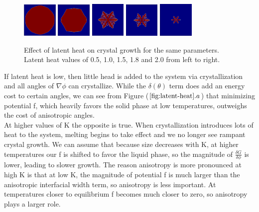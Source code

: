 \documentclass[10pt]{article} %
\begin{document}
\begin{figure}[h!]
  \centering
  \includegraphics[width=0.15\textwidth]{../F-0.5-10.png}
  \includegraphics[width=0.15\textwidth]{../F-1.0-10.png}
  \includegraphics[width=0.15\textwidth]{../F-1.5-10.png}
  \includegraphics[width=0.15\textwidth]{../F-1.8-10.png}
  \includegraphics[width=0.15\textwidth]{../F-2.5-10.png}
  \caption{Effect of latent heat on crystal growth for the same parameters. Latent heat values of 0.5, 1.0, 1.5, 1.8 and 2.0 from left to right.}
  \label{fig:latent-heat}
\end{figure}

If latent heat is low, then little head is added to the system via crystallization and all angles of $\nabla\phi$ can crystallize. While the $\delta(\theta)$ term does add an energy cost to certain angles, we can see from Figure ($\ref{fig:latent-heat}.a$) that minimizing potential f, which heavily favors the solid phase at low temperatures, outweighs the cost of anisotropic angles.\\

At higher values of K the opposite is true. When crystallization introduces lots of heat to the system, melting begins to take effect and we no longer see rampant crystal growth. We can assume that because size decreases with K, at higher temperatures our f is shifted to favor the liquid phase, so the magnitude of $\frac{\delta G}{\delta\phi}$ is lower, leading to slower growth. The reason anisotropy is more pronounced at high K is that at low K, the magnitude of potential f is much larger than the anisotropic interfacial width term, so anisotropy is less important. At temperatures closer to equilibrium f becomes much closer to zero, so anisotropy plays a larger role.\\
\end{document}
